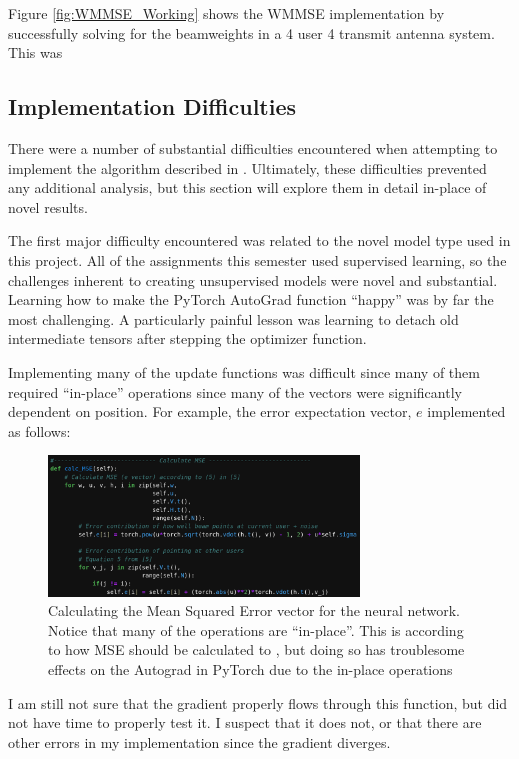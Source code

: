 \documentclass[journal]{IEEEtran}
\begin{document}
Figure \ref{fig:WMMSE_Working} shows the WMMSE implementation by \cite{Deep_Unfolding} successfully solving for the beamweights in a 4 user 4 transmit antenna system. This was 

\subsection{Implementation Difficulties}
There were a number of substantial difficulties encountered when attempting to implement the algorithm described in \cite{LSTM_Net}. Ultimately, these difficulties prevented any additional analysis, but this section will explore them in detail in-place of novel results.

The first major difficulty encountered was related to the novel model type used in this project. All of the assignments this semester used supervised learning, so the challenges inherent to creating unsupervised models were novel and substantial. Learning how to make the PyTorch AutoGrad function ``happy'' was by far the most challenging. A particularly painful lesson was learning to detach old intermediate tensors after stepping the optimizer function. 

Implementing many of the update functions was difficult since many of them required ``in-place'' operations since many of the vectors were significantly dependent on position. For example, the error expectation vector, $e$ implemented as follows:

\begin{figure}[h]%
\includegraphics[width=3.25in]{assets/MSE_Algo.png}%
\caption{Calculating the Mean Squared Error vector for the neural network. Notice that many of the operations are ``in-place''. This is according to how MSE should be calculated to \cite{LSTM_Net}, but doing so has troublesome effects on the Autograd in PyTorch due to the in-place operations}%
\label{fig:LSTM_Algo}%
\end{figure}

I am still not sure that the gradient properly flows through this function, but did not have time to properly test it. I suspect that it does not, or that there are other errors in my implementation since the gradient diverges.
\end{document}
